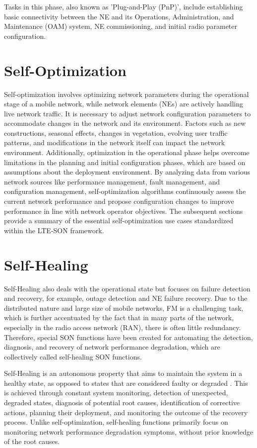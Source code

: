 Tasks in this phase, also known as 'Plug-and-Play (PnP)', include establishing basic connectivity between the NE and its Operations, Administration, and Maintenance (OAM) system, NE commissioning, and initial radio parameter configuration.


\section{Self-Optimization}
Self-optimization involves optimizing network parameters during the operational stage of a mobile network, while network elements (NEs) are actively handling live network traffic. It is necessary to adjust network configuration parameters to accommodate changes in the network and its environment. Factors such as new constructions, seasonal effects, changes in vegetation, evolving user traffic patterns, and modifications in the network itself can impact the network environment. Additionally, optimization in the operational phase helps overcome limitations in the planning and initial configuration phases, which are based on assumptions about the deployment environment. By analyzing data from various network sources like performance management, fault management, and configuration management, self-optimization algorithms continuously assess the current network performance and propose configuration changes to improve performance in line with network operator objectives. The subsequent sections provide a summary of the essential self-optimization use cases standardized within the LTE-SON framework.

\section{Self-Healing}

Self-Healing also deals with the operational state but focuses on failure detection and recovery, for example, outage detection and NE failure recovery. Due to the distributed nature and large size of mobile networks, FM is a challenging task, which is further accentuated by the fact that in many parts of the network, especially in the radio access network (RAN), there is often little redundancy. Therefore, special SON functions have been created for automating the detection, diagnosis, and recovery of network performance degradation, which are collectively called self-healing SON functions.\cite{laiho2006radio}

Self-Healing is an autonomous property that aims to maintain the system in a healthy state, as opposed to states that are considered faulty or degraded \cite{lehser2010deliverable}. This is achieved through constant system monitoring, detection of unexpected, degraded states, diagnosis of potential root causes, identification of corrective actions, planning their deployment, and monitoring the outcome of the recovery process. Unlike self-optimization, self-healing functions primarily focus on monitoring network performance degradation symptoms, without prior knowledge of the root causes.


